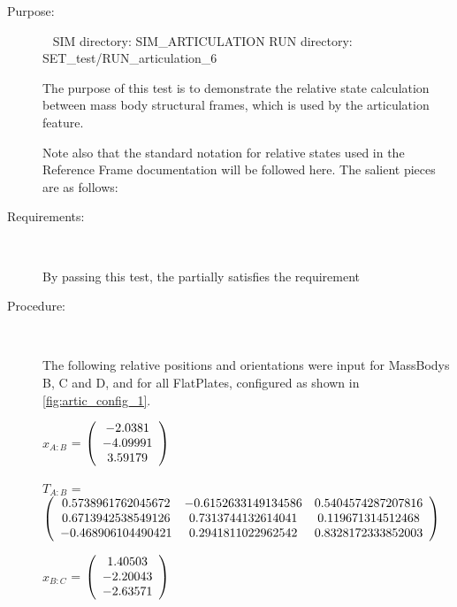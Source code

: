 \begin{description}

\item[Purpose:] \ \newline
SIM directory: SIM\_ARTICULATION
RUN directory: SET\_test/RUN\_articulation\_6

The purpose of this test is to demonstrate the relative state calculation
between mass body structural frames, which is used by the articulation
feature.

Note also that the standard notation for relative states used in the
Reference Frame documentation \cite{dynenv:REFFRAMES} will be
followed here. The salient
pieces are as follows:

\item[Requirements:] \ \newline

By passing this test, the \ModelDesc partially satisfies
the requirement 

\item[Procedure:] \ \newline

The following relative positions and orientations were input for MassBodys
B, C and D, and for all FlatPlates, configured as shown in
\ref{fig:artic_config_1}.

$x_{A:B}$ = $\left( \begin{array} {ccc}    -2.0381 \\   -4.09991 \\    3.59179
\end{array} \right)\\ \\$

$T_{A:B}$ = $\left( \begin{array} {ccc}
   0.5738961762045672 & -0.6152633149134586 & 0.5404574287207816 \\
   0.6713942538549126 & 0.7313744132614041 & 0.119671314512468 \\
   -0.468906104490421 & 0.2941811022962542 & 0.8328172333852003 \\
\end{array} \right)\\ \\$

$x_{B:C}$ = $\left( \begin{array} {ccc}    1.40503 \\   -2.20043 \\   -2.63571
\end{array} \right)\\ \\$


\end{description}
